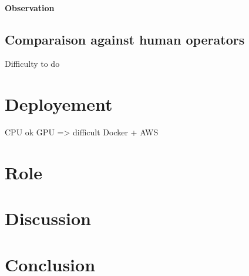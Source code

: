 \documentclass[12pt]{memoir}
\begin{document}
\paragraph{Observation}

\subsection{Comparaison against human operators}
Difficulty to do 

\section{Deployement}
CPU ok 
GPU => difficult 
Docker + AWS 

\section{Role}

\section{Discussion}

\section{Conclusion}

\nocite{*}


\end{document}
